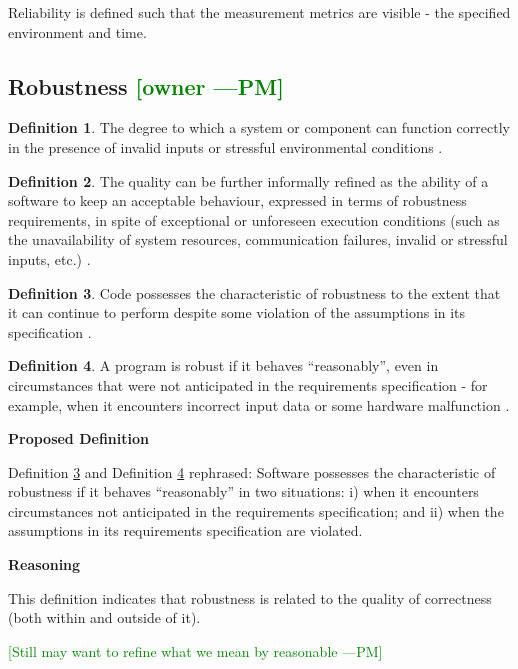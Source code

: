 \documentclass[letterpaper,cleveref]{lipics-v2019}
\newcommand{\authornote}[3]{\textcolor{#1}{[#3 ---#2]}}
\newcommand{\authornote}[3]{}
\newcommand{\pmi}[1]{\authornote{green}{PM}{#1}} %
\theoremstyle{definition}
\newtheorem{defn}{Definition}
\begin{document}
Reliability is defined such that the measurement metrics are visible - the
specified environment and time. 

\subsection{{Robustness} \pmi{owner}}
\begin{defn}
	The degree to which a system or component can function correctly in the
	presence of invalid inputs or stressful environmental conditions
	\citep{IEEEStdGlossarySET1990}.
\end{defn}
\begin{defn}
	The quality can be further informally refined as the ability of a software to
	keep an acceptable behaviour, expressed in terms of robustness requirements,
	in
	spite of exceptional or unforeseen execution conditions (such as the
	unavailability of system resources, communication failures, invalid or
	stressful inputs, etc.) \citep{fernandez2005model}.
\end{defn}
\begin{defn} \label{RobustnessPartialDefn}
	Code possesses the characteristic of robustness to the extent that it can
	continue to perform despite some violation of the assumptions in its
	specification \citep{boehm2007software}.
\end{defn}
\begin{defn} \label{RobustnessDefnSelected}
	A program is robust if it behaves ``reasonably'', even in circumstances that
	were not anticipated in the requirements specification - for example, when it
	encounters incorrect input data or some hardware malfunction
	\citep{ghezzi1991fundamentals}.
\end{defn}

\noindent \textbf{Proposed Definition}

Definition \ref{RobustnessPartialDefn} and Definition
\ref{RobustnessDefnSelected} rephrased: Software possesses the characteristic of
robustness if it behaves ``reasonably'' in two situations: i) when it encounters
circumstances not anticipated in the requirements specification; and ii) when
the assumptions in its requirements specification are violated.

\noindent \textbf{Reasoning}

This definition indicates that robustness is related to the quality of
correctness (both within and outside of it). 

\pmi{Still may want to refine what we mean by reasonable}
\end{document}
